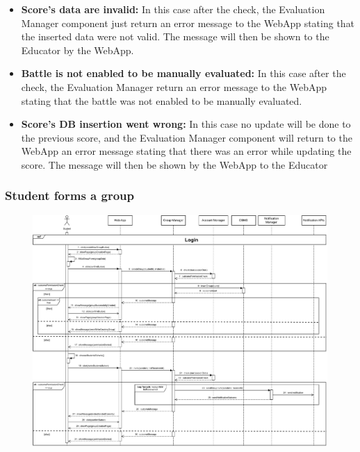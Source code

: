\documentclass{article}
\begin{document}
{\begin{itemize}
            \item \textbf{Score's data are invalid:} In this case after the check, 
            the Evaluation Manager component just return an error message to the 
            WebApp stating that the inserted data were not valid. The message will 
            then be shown to the Educator by the WebApp.
            \item \textbf{Battle is not enabled to be manually evaluated:} In this case after 
            the check, the Evaluation Manager return an error message to the WebApp
            stating that the battle was not enabled to be manually evaluated.
            \item \textbf{Score's DB insertion went wrong:} In this case no update will
            be done to the previous score, and the Evaluation Manager component 
            will return to the WebApp an error message stating that there was an 
            error while updating the score. The message will then be shown by the 
            WebApp to the Educator
        \end{itemize}


    \subsubsection{Student forms a group}
        \begin{figure}[H]
            \centering
            \hspace*{-3.1cm}\includegraphics[scale=0.6]{Sequence/Sequence9DD.pdf}
            \caption{}
            \label{fig:Sequence9DD}
        \end{figure}

}
\end{document}
